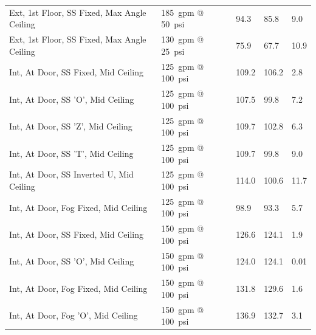 \documentclass[12pt,oneside]{book}
\begin{document}
\begin{table}[!ht]
\begin{tabular}{lllll}
Ext, 1st Floor, SS Fixed, Max Angle Ceiling           & 185~gpm @ 50~psi               &  94.3                             & 85.8                               & 9.0                    \\
Ext, 1st Floor, SS Fixed, Max Angle Ceiling           & 130~gpm @ 25~psi               &  75.9                             & 67.7                               & 10.9                   \\
Int, At Door, SS Fixed, Mid Ceiling                   & 125~gpm @ 100~psi              & 109.2                             & 106.2                              & 2.8                    \\
Int, At Door, SS 'O', Mid Ceiling                     & 125~gpm @ 100~psi              & 107.5                             & 99.8                               & 7.2                    \\
Int, At Door, SS 'Z', Mid Ceiling                     & 125~gpm @ 100~psi              & 109.7                             & 102.8                              & 6.3                    \\
Int, At Door, SS 'T', Mid Ceiling                     & 125~gpm @ 100~psi              & 109.7                             & 99.8                               & 9.0                    \\
Int, At Door, SS Inverted U, Mid Ceiling              & 125~gpm @ 100~psi              & 114.0                             & 100.6                              & 11.7                   \\
Int, At Door, Fog Fixed, Mid Ceiling                  & 125~gpm @ 100~psi              &  98.9                             & 93.3                               & 5.7                    \\
Int, At Door, SS Fixed, Mid Ceiling                   & 150~gpm @ 100~psi              & 126.6                             & 124.1                              & 1.9                    \\
Int, At Door, SS 'O', Mid Ceiling                     & 150~gpm @ 100~psi              & 124.0                             & 124.1                              & 0.01                   \\
Int, At Door, Fog Fixed, Mid Ceiling                  & 150~gpm @ 100~psi              & 131.8                             & 129.6                              & 1.6                    \\
Int, At Door, Fog 'O', Mid Ceiling                    & 150~gpm @ 100~psi              & 136.9                             & 132.7                              & 3.1                    \\

\end{tabular}
\end{table}
\end{document}
